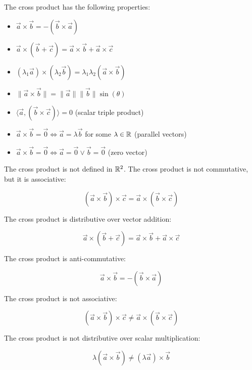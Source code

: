 The cross product has the following properties:

\begin{itemize}

	\item \(\vec{a} \times \vec{b} = -(\vec{b} \times \vec{a})\)

	\item \(\vec{a} \times (\vec{b} + \vec{c}) = \vec{a} \times \vec{b} + \vec{a} \times \vec{c}\)

	\item \((\lambda_1\vec{a}) \times (\lambda_2\vec{b}) = \lambda_1\lambda_2(\vec{a} \times \vec{b})\)

	\item \(\|\vec{a} \times \vec{b}\| = \|\vec{a}\|\|\vec{b}\| \sin(\theta)\)

	\item \(\langle\vec{a}, (\vec{b} \times \vec{c})\rangle = 0\) (scalar triple product)

	\item \(\vec{a} \times \vec{b} = \vec{0} \Leftrightarrow \vec{a} = \lambda\vec{b}\) for some \(\lambda \in \mathbb{R}\) (parallel vectors)

	\item \(\vec{a} \times \vec{b} = \vec{0} \Leftrightarrow \vec{a} = \vec{0} \vee \vec{b} = \vec{0}\) (zero vector)

\end{itemize}

The cross product is not defined in \(\mathbb{R}^2\).
The cross product is not commutative, but it is associative:

\[
	(\vec{a} \times \vec{b}) \times \vec{c} = \vec{a} \times (\vec{b} \times \vec{c})
\]

The cross product is distributive over vector addition:

\[
	\vec{a} \times (\vec{b} + \vec{c}) = \vec{a} \times \vec{b} + \vec{a} \times \vec{c}
\]

The cross product is anti-commutative:

\[
	\vec{a} \times \vec{b} = -(\vec{b} \times \vec{a})
\]

The cross product is not associative:

\[
	(\vec{a} \times \vec{b}) \times \vec{c} \neq \vec{a} \times (\vec{b} \times \vec{c})
\]

The cross product is not distributive over scalar multiplication:

\[
	\lambda(\vec{a} \times \vec{b}) \neq (\lambda\vec{a}) \times \vec{b}
\]

